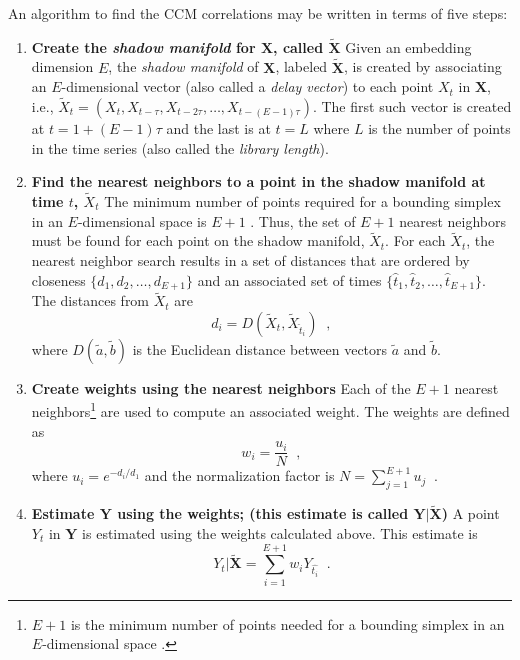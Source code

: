 An algorithm to find the CCM correlations may be written in terms of five steps:
\begin{enumerate}
\item {\bf Create the {\em shadow manifold} for $\mathbf{X}$, called $\tilde{\mathbf{X}}$}
Given an embedding dimension $E$, the {\em shadow manifold} of $\mathbf{X}$, labeled  $\tilde{\mathbf{X}}$, is created by associating an $E$-dimensional vector (also called a {\em delay vector}) to each point $X_t$ in $\mathbf{X}$, i.e., $\tilde{X}_t=\left(X_t,X_{t-\tau},X_{t-2\tau},\ldots,X_{t-(E-1)\tau}\right)$.  The first such vector is created at $t=1+(E-1)\tau$ and the last is at $t=L$ where $L$ is the number of points in the time series (also called the {\em library length}).

\item {\bf Find the nearest neighbors to a point in the shadow manifold at time $t$, $\tilde{X}_t$}
The minimum number of points required for a bounding simplex in an $E$-dimensional space is $E+1$ \cite{Sugihara1990,Sugihara1990a}.  Thus,  the set of $E+1$ nearest neighbors must be found for each point on the shadow manifold, $\tilde{X}_t$.  For each $\tilde{X}_t$, the nearest neighbor search results in a set of distances that are ordered by closeness $\{d_1,d_2,\ldots,d_{E+1}\}$ and an associated set of times $\{\hat{t}_1,\hat{t}_2,\ldots,\hat{t}_{E+1}\}$.  The distances from $\tilde{X}_t$ are
\begin{equation}
d_i = D\left(\tilde{X}_t,\tilde{X}_{\hat{t}_i}\right)\;\;,
\end{equation}
where $D(\tilde{a},\tilde{b})$ is the Euclidean distance between vectors $\tilde{a}$ and $\tilde{b}$.

\item {\bf Create weights using the nearest neighbors}
Each of the $E+1$ nearest neighbors\footnote{$E+1$ is the minimum number of points needed for a bounding simplex in an $E$-dimensional space \cite{Sugihara1990}.} are used to compute an associated weight.  The weights are defined as
\begin{equation}
\label{eqn:CCMweights}
w_i = \frac{u_i}{N}\;\;,
\end{equation}
where
$u_i = e^{-d_i/d_1}$ and the normalization factor is $N = \sum_{j=1}^{E+1} u_j\;\;.$

\item {\bf Estimate $\mathbf{Y}$ using the weights; (this estimate is called $\mathbf{Y}|\tilde{\mathbf{X}}$)}
A point $Y_t$ in $\mathbf{Y}$ is estimated using the weights calculated above.  This estimate is
\begin{equation}
Y_t|\tilde{\mathbf{X}} = \sum_{i=1}^{E+1} w_i Y_{\hat{t_i}}\;\;.
\end{equation}


\end{enumerate}
